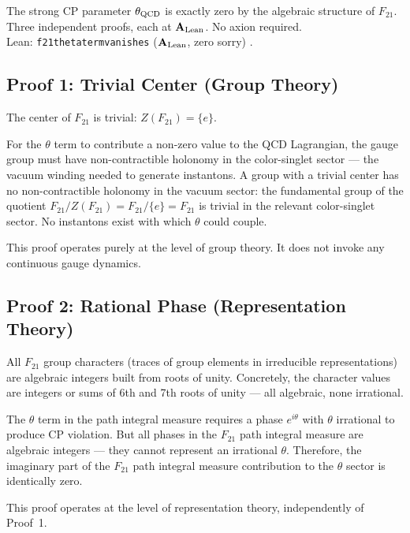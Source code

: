 \documentclass[11pt,openany]{book}
\theoremstyle{remark}
\newcommand{\lean}[1]{%
  \penalty-100
  \begingroup\def\_{\textunderscore\allowbreak}\texttt{#1}\endgroup}
\newcommand{\CatAL}{\ensuremath{\textbf{A}_{\rm Lean}}}
\begin{document}
\begin{tcolorbox}[colback=orange!5,colframe=orange!60,title={Result: $\theta_{\rm QCD} = 0$ by Structure (ROBUST \CatAL)}]
The strong CP parameter $\theta_{\rm QCD}$ is exactly zero by the algebraic structure of
$F_{21}$.  Three independent proofs, each at \CatAL{}.  No axion required.\\[4pt]
Lean: \lean{f21\_theta\_term\_vanishes} (\CatAL, zero sorry)
\cite{SpivackGTEQCDStructure,SpivackGTEUnification}.
\end{tcolorbox}

\subsection*{Proof 1: Trivial Center (Group Theory)}

The center of $F_{21}$ is trivial: $Z(F_{21}) = \{e\}$.

For the $\theta$ term to contribute a non-zero value to the QCD Lagrangian, the gauge
group must have non-contractible holonomy in the color-singlet sector --- the vacuum
winding needed to generate instantons.  A group with a trivial center has no
non-contractible holonomy in the vacuum sector: the fundamental group of the quotient
$F_{21}/Z(F_{21}) = F_{21}/\{e\} = F_{21}$ is trivial in the relevant color-singlet
sector.  No instantons exist with which $\theta$ could couple.

This proof operates purely at the level of group theory.  It does not invoke any
continuous gauge dynamics.

\subsection*{Proof 2: Rational Phase (Representation Theory)}

All $F_{21}$ group characters (traces of group elements in irreducible representations)
are algebraic integers built from roots of unity.  Concretely, the character values are
integers or sums of 6th and 7th roots of unity --- all algebraic, none irrational.

The $\theta$ term in the path integral measure requires a phase $e^{i\theta}$ with
$\theta$ irrational to produce CP violation.  But all phases in the $F_{21}$ path
integral measure are algebraic integers --- they cannot represent an irrational $\theta$.
Therefore, the imaginary part of the $F_{21}$ path integral measure contribution to the
$\theta$ sector is identically zero.

This proof operates at the level of representation theory, independently of Proof~1.
\end{document}
